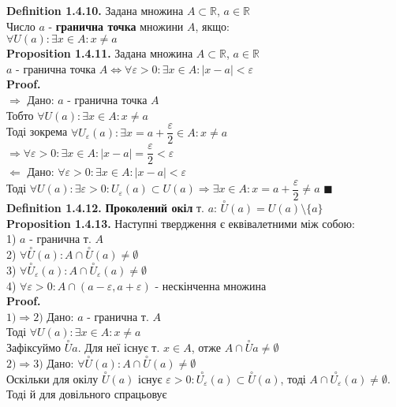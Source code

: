 \documentclass[a4paper, 14pt]{extarticle}
\def\bigline{\vspace{5mm}\\}
\def\defin#1{\textbf{Definition {#1}}}
\def\prp#1{\textbf{Proposition {#1}}}
\def\proof{\textbf{Proof.}\\}
\def\bigline{\vspace{5mm}\\}
\def\qed{$\blacksquare$}
\begin{document}
\defin{1.4.10.} Задана множина $A \subset \mathbb{R}$, $a \in \mathbb{R}$\\
Число $a$ - \textbf{гранична точка} множини $A$, якщо:\\
$\forall U(a): \exists x \in A: x \neq a$
\bigline
\prp{1.4.11.} Задана множина $A \subset \mathbb{R}$, $a \in \mathbb{R}$\\
$a$ - гранична точка $A \iff \forall \varepsilon > 0: \exists x \in A: |x-a|<\varepsilon$\\
\proof
$\boxed{\Rightarrow}$ Дано: $a$ - гранична точка $A$\\
Тобто $\forall U(a): \exists x \in A: x \neq a$\\
Тоді зокрема $\forall U_{\varepsilon}(a): \exists x = a + \dfrac{\varepsilon}{2} \in A: x \neq a$\\
$\Rightarrow \forall \varepsilon > 0: \exists x \in A: |x-a| = \dfrac{\varepsilon}{2} < \varepsilon$
\bigline
$\boxed{\Leftarrow}$ Дано: $\forall \varepsilon > 0: \exists x \in A: |x-a| < \varepsilon$\\
Тоді $\forall U(a): \exists \varepsilon > 0: U_{\varepsilon}(a) \subset U(a) \Rightarrow \exists x \in A: x = a+ \dfrac{\varepsilon}{2} \neq a$ \qed
\bigline
\defin{1.4.12.} \textbf{Проколений окіл} т. $a$: $\overset{\circ}{U}(a) = U(a) \setminus \{a\}$
\bigline
\prp{1.4.13.} Наступні твердження є еквівалетними між собою:\\
1) $a$ - гранична т. $A$\\
2) $\forall \overset{\circ}{U}(a): A \cap \overset{\circ}{U}(a) \neq \emptyset$\\
3) $\forall \overset{\circ}{U}_{\varepsilon}(a): A \cap \overset{\circ}{U}_{\varepsilon}(a) \neq \emptyset$\\
4) $\forall \varepsilon > 0: A \cap (a-\varepsilon, a+\varepsilon)$ - нескінченна множина\\
\proof
$\boxed{1) \Rightarrow 2)}$ Дано: $a$ - гранична т. $A$\\
Тоді $\forall U(a): \exists x \in A: x \neq a$\\
Зафіксуймо $\overset{\circ}{U}{a}$. Для неї існує т. $x \in A$, отже $A \cap \overset{\circ}{U}{a} \neq \emptyset$
\bigline
$\boxed{2) \Rightarrow 3)}$ Дано: $\forall \overset{\circ}{U}(a): A \cap \overset{\circ}{U}(a) \neq \emptyset$\\
Оскільки для окілу $\overset{\circ}{U}(a)$ існує $\varepsilon > 0: \overset{\circ}{U_\varepsilon}(a) \subset \overset{\circ}{U}(a)$, тоді $A \cap \overset{\circ}{U_\varepsilon}(a) \neq \emptyset$. Тоді й для довільного спрацьовує
\end{document}

